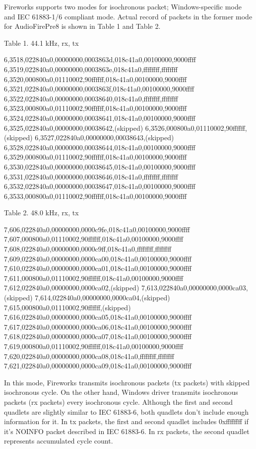 Fireworks supports two modes for isochronous packet; Windows-specific mode and IEC 61883-1/6 compliant mode. Actual record of packets in the former mode for AudioFirePre8 is shown in Table 1 and Table 2.

Table 1. 44.1 kHz, rx, tx

6,3518,022840a0,00000000,0003863d,018c41a0,00100000,9000ffff
6,3519,022840a0,00000000,0003863e,018c41a0,ffffffff,ffffffff
6,3520,000800a0,01110002,90ffffff,018c41a0,00100000,9000ffff
6,3521,022840a0,00000000,0003863f,018c41a0,00100000,9000ffff
6,3522,022840a0,00000000,00038640,018c41a0,ffffffff,ffffffff
6,3523,000800a0,01110002,90ffffff,018c41a0,00100000,9000ffff
6,3524,022840a0,00000000,00038641,018c41a0,00100000,9000ffff
6,3525,022840a0,00000000,00038642,(skipped)
6,3526,000800a0,01110002,90ffffff,(skipped)
6,3527,022840a0,00000000,00038643,(skipped)
6,3528,022840a0,00000000,00038644,018c41a0,00100000,9000ffff
6,3529,000800a0,01110002,90ffffff,018c41a0,00100000,9000ffff
6,3530,022840a0,00000000,00038645,018c41a0,00100000,9000ffff
6,3531,022840a0,00000000,00038646,018c41a0,ffffffff,ffffffff
6,3532,022840a0,00000000,00038647,018c41a0,00100000,9000ffff
6,3533,000800a0,01110002,90ffffff,018c41a0,00100000,9000ffff

Table 2. 48.0 kHz, rx, tx

7,606,022840a0,00000000,0000c9fe,018c41a0,00100000,9000ffff
7,607,000800a0,01110002,90ffffff,018c41a0,00100000,9000ffff
7,608,022840a0,00000000,0000c9ff,018c41a0,ffffffff,ffffffff
7,609,022840a0,00000000,0000ca00,018c41a0,00100000,9000ffff
7,610,022840a0,00000000,0000ca01,018c41a0,00100000,9000ffff
7,611,000800a0,01110002,90ffffff,018c41a0,00100000,9000ffff
7,612,022840a0,00000000,0000ca02,(skipped)
7,613,022840a0,00000000,0000ca03,(skipped)
7,614,022840a0,00000000,0000ca04,(skipped)
7,615,000800a0,01110002,90ffffff,(skipped)
7,616,022840a0,00000000,0000ca05,018c41a0,00100000,9000ffff
7,617,022840a0,00000000,0000ca06,018c41a0,00100000,9000ffff
7,618,022840a0,00000000,0000ca07,018c41a0,00100000,9000ffff
7,619,000800a0,01110002,90ffffff,018c41a0,00100000,9000ffff
7,620,022840a0,00000000,0000ca08,018c41a0,ffffffff,ffffffff
7,621,022840a0,00000000,0000ca09,018c41a0,00100000,9000ffff

In this mode, Fireworks transmits isochronous packets (tx packets) with skipped isochronous cycle. On the other hand, Windows driver transmits isochronous packets (rx packets) every isochronous cycle. Although the first and second quadlets are slightly similar to IEC 61883-6, both quadlets don't include enough information for it. In tx packets, the first and second quadlet includes 0xffffffff if it's NOINFO packet described in IEC 61883-6. In rx packets, the second quadlet represents accumulated cycle count.


